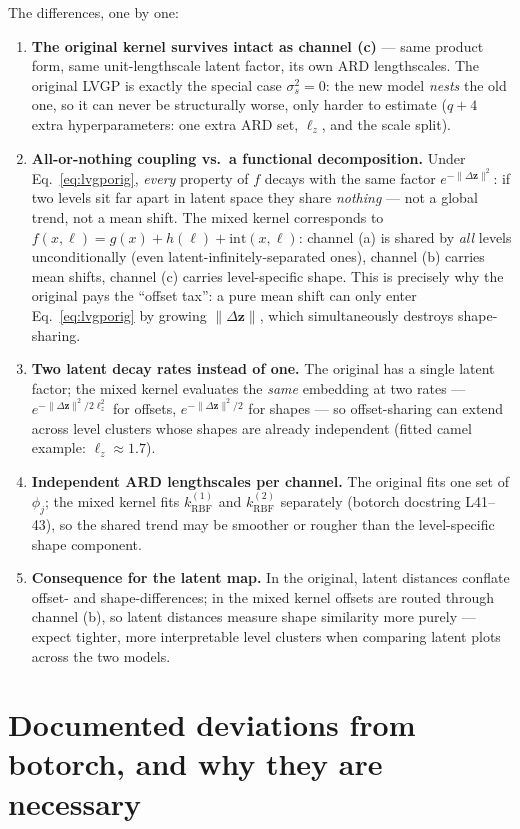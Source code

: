 \documentclass[11pt]{article}
\begin{document}
The differences, one by one:
\begin{enumerate}
\item \textbf{The original kernel survives intact as channel (c)} --- same product form, same
unit-lengthscale latent factor, its own ARD lengthscales. The original LVGP is exactly the
special case $\sigma_s^2 = 0$: the new model \emph{nests} the old one, so it can never be
structurally worse, only harder to estimate ($q{+}4$ extra hyperparameters: one extra ARD set,
$\ell_z$, and the scale split).
\item \textbf{All-or-nothing coupling vs.\ a functional decomposition.} Under
Eq.~\ref{eq:lvgporig}, \emph{every} property of $f$ decays with the same factor
$e^{-\|\Delta\mathbf z\|^2}$: if two levels sit far apart in latent space they share
\emph{nothing} --- not a global trend, not a mean shift. The mixed kernel corresponds to
$f(x,\ell) = g(x) + h(\ell) + \mathrm{int}(x,\ell)$: channel (a) is shared by \emph{all}
levels unconditionally (even latent-infinitely-separated ones), channel (b) carries mean
shifts, channel (c) carries level-specific shape. This is precisely why the original pays the
``offset tax'': a pure mean shift can only enter Eq.~\ref{eq:lvgporig} by growing
$\|\Delta\mathbf z\|$, which simultaneously destroys shape-sharing.
\item \textbf{Two latent decay rates instead of one.} The original has a single latent factor;
the mixed kernel evaluates the \emph{same} embedding at two rates ---
$e^{-\|\Delta\mathbf z\|^2/2\ell_z^2}$ for offsets, $e^{-\|\Delta\mathbf z\|^2/2}$ for shapes
--- so offset-sharing can extend across level clusters whose shapes are already independent
(fitted camel example: $\ell_z\!\approx\!1.7$).
\item \textbf{Independent ARD lengthscales per channel.} The original fits one set of
$\phi_j$; the mixed kernel fits $k^{(1)}_{\mathrm{RBF}}$ and $k^{(2)}_{\mathrm{RBF}}$
separately (botorch docstring L41--43), so the shared trend may be smoother or rougher than
the level-specific shape component.
\item \textbf{Consequence for the latent map.} In the original, latent distances conflate
offset- and shape-differences; in the mixed kernel offsets are routed through channel (b), so
latent distances measure shape similarity more purely --- expect tighter, more interpretable
level clusters when comparing latent plots across the two models.
\end{enumerate}

\section{Documented deviations from botorch, and why they are necessary}
\end{document}
